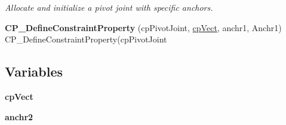 \begin{DoxyCompactItemize}
\begin{DoxyCompactList}\small\item\em Allocate and initialize a pivot joint with specific anchors. \end{DoxyCompactList}\item 
\hypertarget{group__cp_pivot_joint_ga12e5f05e2f95ad47c8c811a9141059fe}{{\bfseries C\-P\-\_\-\-Define\-Constraint\-Property} (cp\-Pivot\-Joint, \hyperlink{structcp_vect}{cp\-Vect}, anchr1, Anchr1) C\-P\-\_\-\-Define\-Constraint\-Property(cp\-Pivot\-Joint}\label{group__cp_pivot_joint_ga12e5f05e2f95ad47c8c811a9141059fe}

\end{DoxyCompactItemize}
\subsection*{Variables}
\begin{DoxyCompactItemize}
\item 
\hypertarget{group__cp_pivot_joint_gae5bb48004c89589d2d4b8008db38754e}{{\bfseries cp\-Vect}}\label{group__cp_pivot_joint_gae5bb48004c89589d2d4b8008db38754e}

\item 
\hypertarget{group__cp_pivot_joint_gaed362236d55092056b72ea837860308b}{{\bfseries anchr2}}\label{group__cp_pivot_joint_gaed362236d55092056b72ea837860308b}

\end{DoxyCompactItemize}

